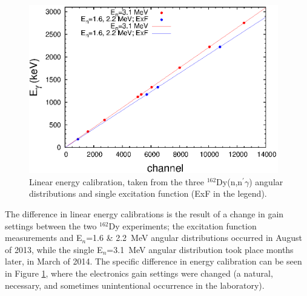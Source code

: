 \begin{figure}[ht]
\begin{center}
\includegraphics[width=0.97\textwidth]{figures/310_energy_calib.eps}
\caption{Linear energy calibration, taken from the three $^{162}$Dy(n,n$^{\prime}\gamma$) angular distributions and single excitation function (ExF in the legend).}
\label{fig:energy_calib}
\end{center}
\end{figure}

The difference in linear energy calibrations is the result of a change in gain settings between the two $^{162}$Dy experiments; the excitation function measurements and E$_n$=1.6 \& 2.2~MeV angular distributions occurred in August of 2013, while the single E$_n$=3.1~MeV angular distribution took place months later, in March of 2014. The specific difference in energy calibration can be seen in Figure \ref{fig:energy_calib}, where the electronics gain settings were changed (a natural, necessary, and sometimes unintentional occurrence in the laboratory). %

